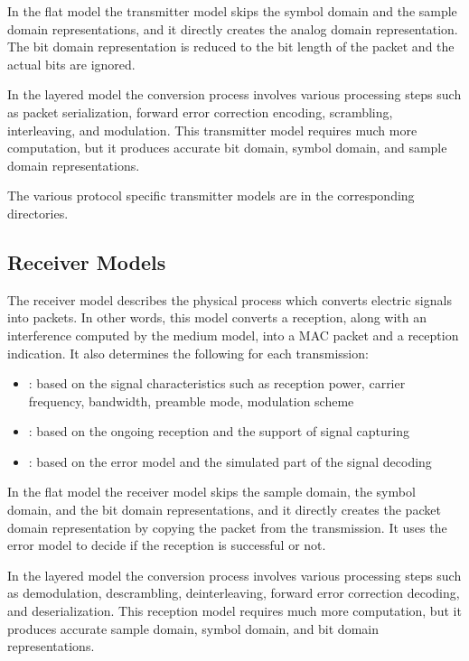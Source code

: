 In the flat model the transmitter model skips the symbol domain and the sample
domain representations, and it directly creates the analog domain representation.
The bit domain representation is reduced to the bit length of the packet and the
actual bits are ignored.

In the layered model the conversion process involves various processing steps
such as packet serialization, forward error correction encoding, scrambling,
interleaving, and modulation. This transmitter model requires much more
computation, but it produces accurate bit domain, symbol domain, and sample
domain representations.

The various protocol specific transmitter models are in the corresponding
directories.

\subsection{Receiver Models}

The receiver model describes the physical process which converts electric
signals into packets. In other words, this model converts a reception, along
with an interference computed by the medium model, into a MAC packet and a
reception indication. It also determines the following for each transmission:

\begin{itemize}
  \item {}: based on the signal
characteristics such as reception power, carrier frequency, bandwidth, preamble
mode, modulation scheme
  \item {}: based
on the ongoing reception and the support of signal capturing
  \item {}:
based on the error model and the simulated part of the signal decoding
\end{itemize}

In the flat model the receiver model skips the sample domain, the symbol domain,
and the bit domain representations, and it directly creates the packet domain
representation by copying the packet from the transmission. It uses the error
model to decide if the reception is successful or not.

In the layered model the conversion process involves various processing steps
such as demodulation, descrambling, deinterleaving, forward error correction
decoding, and deserialization. This reception model requires much more
computation, but it produces accurate sample domain, symbol domain, and bit
domain representations.


